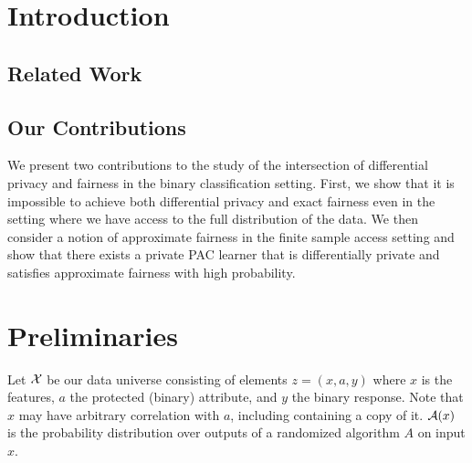 \section{Introduction}


\subsection{Related Work}


\subsection{Our Contributions}
We present two contributions to the study of the intersection of
differential privacy and fairness in the binary classification setting.
First, we show that it is impossible to achieve both differential
privacy and exact fairness even in the setting where we have access to
the full distribution of the data. We then consider a notion of
approximate fairness in the finite sample access setting and show that
there exists a private PAC learner that is differentially private and
satisfies approximate fairness with high probability. 


\section{Preliminaries}
Let $\mathcal{X}$ be our data universe consisting of elements $z=(x,a,y)$
 where $x$ is the features, $a$ the protected (binary) attribute, and
 $y$ the binary response. Note that $x$ may have arbitrary correlation
 with $a$, including containing a copy of it. $\mathcal{A}(x)$ is the
 probability distribution over outputs of a randomized algorithm $A$ on
 input $x$.



